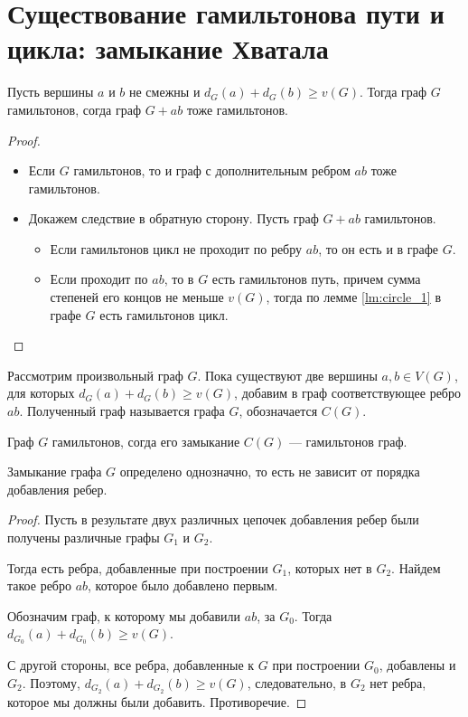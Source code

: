 \section{Существование гамильтонова пути и цикла: замыкание Хватала}

\begin{lemma}\label{lm:circle_2}
    Пусть вершины $a$ и $b$ не смежны и $d_G(a) + d_G(b) \ge v(G)$. Тогда граф $G$ гамильтонов, согда граф $G + ab$ тоже гамильтонов.
\end{lemma}
\begin{proof}
	\begin{itemize}
		\item Если $G$ гамильтонов, то и граф с дополнительным ребром $ab$ тоже гамильтонов.
		\item Докажем следствие в обратную сторону. Пусть граф $G + ab$ гамильтонов. 
			\begin{itemize}
				\item Если гамильтонов цикл не проходит по ребру $ab$, то он есть и в графе $G$. 
				\item Если проходит по $ab$, то в $G$ есть гамильтонов путь, причем сумма степеней его концов не меньше $v(G)$, тогда по лемме \ref{lm:circle_1} в графе $G$ есть гамильтонов цикл.
			\end{itemize}
	\end{itemize}    
\end{proof}

\begin{definition}
	Рассмотрим произвольный граф $G$. Пока существуют две вершины $a, b \in V(G)$, для которых $d_G(a) + d_G(b) \ge v(G)$, добавим в граф соответствующее ребро $ab$. Полученный граф называется  графа $G$, обозначается $C(G)$.
\end{definition}

\begin{corollary}[Хватал, 1974]
    Граф $G$ гамильтонов, согда его замыкание $C(G)$ --- гамильтонов граф.
\end{corollary}

\begin{lemma}\label{lm:circle_3}
    Замыкание графа $G$ определено однозначно, то есть не зависит от порядка добавления ребер.
\end{lemma}
\begin{proof}
    Пусть в результате двух различных цепочек добавления ребер были получены различные графы $G_1$ и $G_2$.

	Тогда есть ребра, добавленные при построении $G_1$, которых нет в $G_2$. Найдем такое ребро $ab$, которое было добавлено первым. 

	Обозначим граф, к которому мы добавили $ab$, за $G_0$. Тогда $d_{G_0}(a) + d_{G_0}(b) \ge v(G)$.

	С другой стороны, все ребра, добавленные к $G$ при построении $G_0$, добавлены и $G_2$. Поэтому, $d_{G_2}(a) + d_{G_2}(b) \ge v(G)$, следовательно, в $G_2$ нет ребра, которое мы должны были добавить. Противоречие. 
\end{proof}
